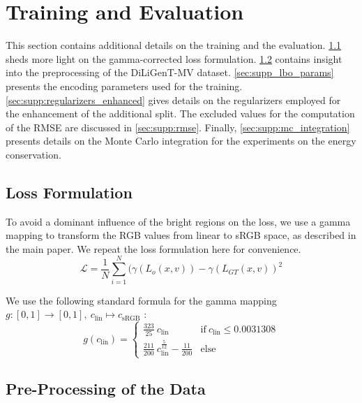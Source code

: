 \section{Training and Evaluation}
\label{sec:supp:training_and_eval}

This section contains additional details on the training and the evaluation. \cref{sec:supp_loss_formulation} sheds more light on the gamma-corrected loss formulation. \cref{sec:supp:pre_proc_data} contains insight into the preprocessing of the DiLiGenT-MV dataset. \cref{sec:supp_lbo_params} presents the encoding parameters used for the training. \cref{sec:supp:regularizers_enhanced} gives details on the regularizers employed for the enhancement of the additional split. The excluded values for the computation of the RMSE are discussed in \cref{sec:supp:rmse}. Finally, \cref{sec:supp:mc_integration} presents details on the Monte Carlo integration for the experiments on the energy conservation.

\subsection{Loss Formulation}
\label{sec:supp_loss_formulation}

To avoid a dominant influence of the bright regions on the loss, we use a gamma mapping to transform the RGB values from linear to sRGB space, as described in
\iftoggle{arxiv}{\cref{eq:loss}}{Eq. (10)}
the main paper. We repeat the loss formulation here for convenience.
\begin{equation}
    \mathcal{L} = \frac{1}{N}\sum_{i=1}^N (\gamma(L_o(x, v)) - \gamma(L_{GT}(x, v))^2
\end{equation}

We use the following standard formula for the gamma mapping $g:[0,1]\rightarrow[0,1],~c_{\mathrm{lin}}\mapsto c_{\mathrm{sRGB}}$ \cite{akenine2019realTimeRendering}:
\begin{equation}
    g(c_{\mathrm{lin}}) = \begin{cases}
        \frac{323}{25}~c_{\mathrm{lin}} & \mathrm{if}~c_{\mathrm{lin}}\leq0.0031308 \\
        \frac{211}{200}~c_{\mathrm{lin}}^\frac{5}{12} - \frac{11}{200} & \mathrm{else }  
    \end{cases}
\end{equation}


\subsection{Pre-Processing of the Data}
\label{sec:supp:pre_proc_data}

